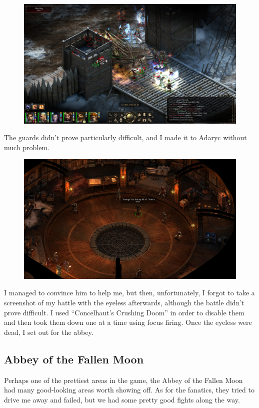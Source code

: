 \documentclass{article}
\begin{document}
\begin{figure}
\includegraphics[scale=0.33]{files/blog/2020_01_18_poe_potd_wmpt2/2020_01_18_fort1.jpg}
\end{figure}

The guards didn't prove particularly difficult, and I made it to Adaryc without much problem.

\begin{figure}
\includegraphics[scale=0.33]{files/blog/2020_01_18_poe_potd_wmpt2/2020_01_18_fort2.jpg}
\end{figure}

I managed to convince him to help me, but then, unfortunately, I forgot to take a screenshot of my battle with the eyeless afterwards, although the battle didn't prove difficult.  I used ``Concelhaut's Crushing Doom'' in order to disable them and then took them down one at a time using focus firing.  Once the eyeless were dead, I set out for the abbey.

\subsection{Abbey of the Fallen Moon}
Perhaps one of the prettiest areas in the game, the Abbey of the Fallen Moon had many good-looking areas worth showing off.  As for the fanatics, they tried to drive me away and failed, but we had some pretty good fights along the way.
\end{document}
